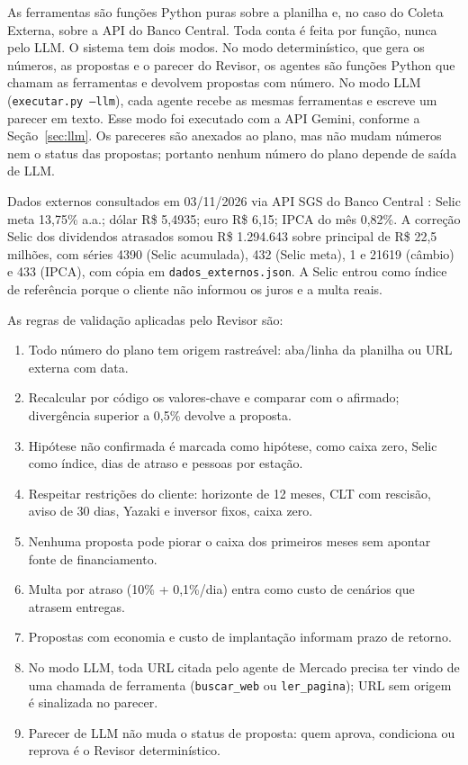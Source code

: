\documentclass[12pt,a4paper,oneside,brazil]{abntex2}
\begin{document}
As ferramentas são funções Python puras sobre a planilha e, no caso do Coleta Externa, sobre a API do Banco Central. Toda conta é feita por função, nunca pelo LLM. O sistema tem dois modos. No modo determinístico, que gera os números, as propostas e o parecer do Revisor, os agentes são funções Python que chamam as ferramentas e devolvem propostas com número. No modo LLM (\texttt{executar.py --llm}), cada agente recebe as mesmas ferramentas e escreve um parecer em texto. Esse modo foi executado com a API Gemini, conforme a Seção~\ref{sec:llm}. Os pareceres são anexados ao plano, mas não mudam números nem o status das propostas; portanto nenhum número do plano depende de saída de LLM.

Dados externos consultados em 03/11/2026 via API SGS do Banco Central \cite{bcb2026sgs}: Selic meta 13,75\% a.a.; dólar R\$ 5,4935; euro R\$ 6,15; IPCA do mês 0,82\%. A correção Selic dos dividendos atrasados somou R\$ 1.294.643 sobre principal de R\$ 22,5 milhões, com séries 4390 (Selic acumulada), 432 (Selic meta), 1 e 21619 (câmbio) e 433 (IPCA), com cópia em \texttt{dados\_externos.json}. A Selic entrou como índice de referência porque o cliente não informou os juros e a multa reais.

As regras de validação aplicadas pelo Revisor são:

\begin{enumerate}
\item Todo número do plano tem origem rastreável: aba/linha da planilha ou URL externa com data.
\item Recalcular por código os valores-chave e comparar com o afirmado; divergência superior a 0,5\% devolve a proposta.
\item Hipótese não confirmada é marcada como hipótese, como caixa zero, Selic como índice, dias de atraso e pessoas por estação.
\item Respeitar restrições do cliente: horizonte de 12 meses, CLT com rescisão, aviso de 30 dias, Yazaki e inversor fixos, caixa zero.
\item Nenhuma proposta pode piorar o caixa dos primeiros meses sem apontar fonte de financiamento.
\item Multa por atraso (10\% + 0,1\%/dia) entra como custo de cenários que atrasem entregas.
\item Propostas com economia e custo de implantação informam prazo de retorno.
\item No modo LLM, toda URL citada pelo agente de Mercado precisa ter vindo de uma chamada de ferramenta (\texttt{buscar\_web} ou \texttt{ler\_pagina}); URL sem origem é sinalizada no parecer.
\item Parecer de LLM não muda o status de proposta: quem aprova, condiciona ou reprova é o Revisor determinístico.
\end{enumerate}
\end{document}
